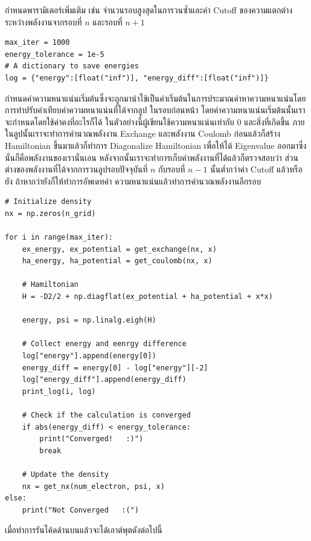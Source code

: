 กำหนดพารามิเตอร์เพิ่มเติม เช่น จำนวนรอบสูงสุดในการวนซ้ำและค่า Cutoff ของความแตกต่างระหว่างพลังงานจากรอบที่ $n$ และรอบที่ $n+1$

\begin{lstlisting}[style=MyPython]
max_iter = 1000
energy_tolerance = 1e-5
# A dictionary to save energies
log = {"energy":[float("inf")], "energy_diff":[float("inf")]}
\end{lstlisting}

\vspace{1em}

กำหนดค่าความหนาแน่นเริ่มต้นซึ่งจะถูกมานำใช้เป็นค่าเริ่มต้นในการประมาณค่าหาความหนาแน่นโดยการทำปรับค่าเทียบค่าความหนาแน่นที่ได้จากลูป%
ในรอบก่อนหน้า โดยค่าความหนาแน่นเริ่มต้นนั้นเราจะกำหนดโดยใช้ค่าคงที่อะไรก็ได้ ในตัวอย่างนี้ผู้เขียนใช้ความหนาแน่นเท่ากับ 0 และสิ่งที่เกิดขึ้น%
ภายในลูปนั้นเราจะทำการคำนวณพลังงาน Exchange และพลังงาน Coulomb ก่อนแล้วก็สร้าง Hamiltonian ขึ้นมาแล้วก็ทำการ Diagonalize 
Hamiltonian เพื่อให้ได้ Eigenvalue ออกมาซึ่งนั่นก็คือพลังงานของเรานั่นเอน หลังจากนั้นเราจะทำการเก็บค่าพลังงานที่ได้แล้วก็ตรวจสอบว่า%
ส่วนต่างของพลังงานที่ได้จากการวนลูปรอบปัจจุบันที่ $n$ กับรอบที่ $n-1$ นั้นต่ำกว่าค่า Cutoff แล้วหรือยัง ถ้าหากว่ายังก็ให้ทำการอัพเดทค่า%
ความหนาแน่นแล้วทำการคำนวณพลังงานอีกรอบ

\begin{lstlisting}[style=MyPython]
# Initialize density
nx = np.zeros(n_grid)

for i in range(max_iter):
    ex_energy, ex_potential = get_exchange(nx, x)
    ha_energy, ha_potential = get_coulomb(nx, x)
    
    # Hamiltonian
    H = -D2/2 + np.diagflat(ex_potential + ha_potential + x*x)
    
    energy, psi = np.linalg.eigh(H)
    
    # Collect energy and eenrgy difference
    log["energy"].append(energy[0])
    energy_diff = energy[0] - log["energy"][-2]
    log["energy_diff"].append(energy_diff)
    print_log(i, log)
    
    # Check if the calculation is converged
    if abs(energy_diff) < energy_tolerance:
        print("Converged!   :)")
        break
    
    # Update the density
    nx = get_nx(num_electron, psi, x)
else:
    print("Not Converged   :(")
\end{lstlisting}

\vspace{1em}

\noindent เมื่อทำการรันโค้ดด้านบนแล้วจะได้เอาต์พุตดังต่อไปนี้


